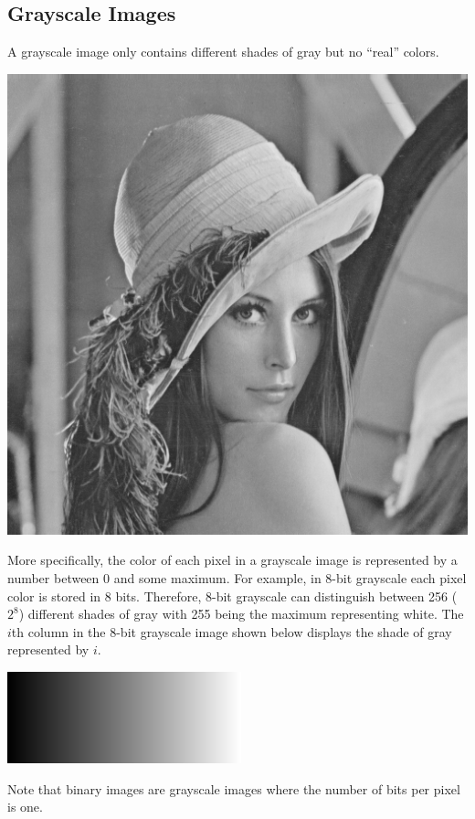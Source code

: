 \documentclass{book}
\begin{document}
\subsection{Grayscale Images}
A grayscale image only contains different shades of gray but no ``real'' colors. 
\begin{center}
\includegraphics[scale=0.15]{lena-gray.png}
\end{center}
More specifically, the color of each pixel in a grayscale image is represented by a number between 0 and some maximum. For example, in 8-bit grayscale each pixel color is stored in 8 bits. Therefore, 8-bit grayscale can distinguish between 256 ($2^8$) different shades of gray with 255 being the maximum representing white. The $i$th column in the 8-bit grayscale image shown below displays the shade of gray represented by $i$.
\begin{center}
\includegraphics[scale=0.75]{gradient-image.png}
\end{center}
Note that binary images are grayscale images where the number of bits per pixel is one.
\end{document}
